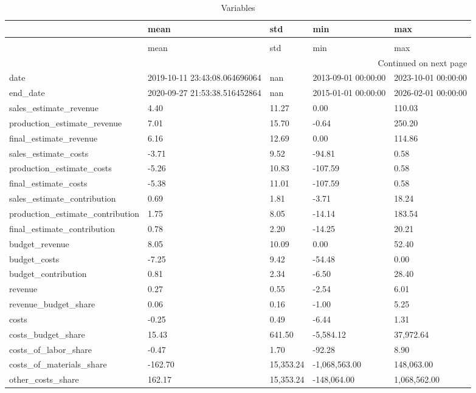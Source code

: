 \begin{longtable}{lllll}
\caption{Variables} \label{eda_1} \\
\toprule
 & mean & std & min & max \\
\midrule
\endfirsthead
\caption[]{Variables} \\
\toprule
 & mean & std & min & max \\
\midrule
\endhead
\midrule
\multicolumn{5}{r}{Continued on next page} \\
\midrule
\endfoot
\bottomrule
\endlastfoot
date & 2019-10-11 23:43:08.064696064 & nan & 2013-09-01 00:00:00 & 2023-10-01 00:00:00 \\
end_date & 2020-09-27 21:53:38.516452864 & nan & 2015-01-01 00:00:00 & 2026-02-01 00:00:00 \\
sales_estimate_revenue & 4.40 & 11.27 & 0.00 & 110.03 \\
production_estimate_revenue & 7.01 & 15.70 & -0.64 & 250.20 \\
final_estimate_revenue & 6.16 & 12.69 & 0.00 & 114.86 \\
sales_estimate_costs & -3.71 & 9.52 & -94.81 & 0.58 \\
production_estimate_costs & -5.26 & 10.83 & -107.59 & 0.58 \\
final_estimate_costs & -5.38 & 11.01 & -107.59 & 0.58 \\
sales_estimate_contribution & 0.69 & 1.81 & -3.71 & 18.24 \\
production_estimate_contribution & 1.75 & 8.05 & -14.14 & 183.54 \\
final_estimate_contribution & 0.78 & 2.20 & -14.25 & 20.21 \\
budget_revenue & 8.05 & 10.09 & 0.00 & 52.40 \\
budget_costs & -7.25 & 9.42 & -54.48 & 0.00 \\
budget_contribution & 0.81 & 2.34 & -6.50 & 28.40 \\
revenue & 0.27 & 0.55 & -2.54 & 6.01 \\
revenue_budget_share & 0.06 & 0.16 & -1.00 & 5.25 \\
costs & -0.25 & 0.49 & -6.44 & 1.31 \\
costs_budget_share & 15.43 & 641.50 & -5,584.12 & 37,972.64 \\
costs_of_labor_share & -0.47 & 1.70 & -92.28 & 8.90 \\
costs_of_materials_share & -162.70 & 15,353.24 & -1,068,563.00 & 148,063.00 \\
other_costs_share & 162.17 & 15,353.24 & -148,064.00 & 1,068,562.00 \\

\end{longtable}
